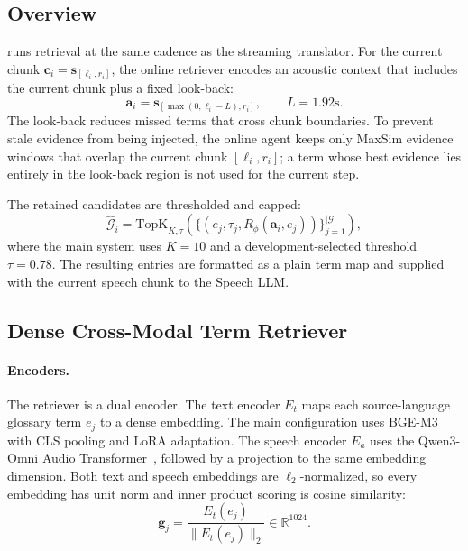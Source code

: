 \subsection{\method Overview}
\label{sec:method_overview}

\method runs retrieval at the same cadence as the streaming translator. For the current chunk $\mathbf{c}_i=\mathbf{s}_{[\ell_i,r_i]}$, the online retriever encodes an acoustic context that includes the current chunk plus a fixed look-back:
\begin{equation}
  \mathbf{a}_i=\mathbf{s}_{[\max(0,\ell_i-L),r_i]},
  \qquad L=1.92\mathrm{s}.
\end{equation}
The look-back reduces missed terms that cross chunk boundaries. To prevent stale evidence from being injected, the online agent keeps only MaxSim evidence windows that overlap the current chunk $[\ell_i,r_i]$; a term whose best evidence lies entirely in the look-back region is not used for the current step.

The retained candidates are thresholded and capped:
\begin{equation}
  \hat{\mathcal{G}}_i =
  \mathrm{TopK}_{K,\tau}\left(\{(e_j,\tau_j,R_\phi(\mathbf{a}_i,e_j))\}_{j=1}^{|\mathcal{G}|}\right),
\end{equation}
where the main system uses $K=10$ and a development-selected threshold $\tau=0.78$. The resulting entries are formatted as a plain term map and supplied with the current speech chunk to the Speech LLM.

\subsection{Dense Cross-Modal Term Retriever}
\label{sec:retriever}

\paragraph{Encoders.}
The retriever is a dual encoder. The text encoder $E_t$ maps each source-language glossary term $e_j$ to a dense embedding. The main configuration uses BGE-M3~\citep{chen-etal-2024-m3} with CLS pooling and LoRA adaptation. The speech encoder $E_a$ uses the Qwen3-Omni Audio Transformer~\citep{xu2025qwen3omnitechnicalreport}, followed by a projection to the same embedding dimension. Both text and speech embeddings are $\ell_2$-normalized, so every embedding has unit norm and inner product scoring is cosine similarity:
\begin{equation}
  \mathbf{g}_j =
  \frac{E_t(e_j)}{\|E_t(e_j)\|_2}
  \in \mathbb{R}^{1024}.
\end{equation}

